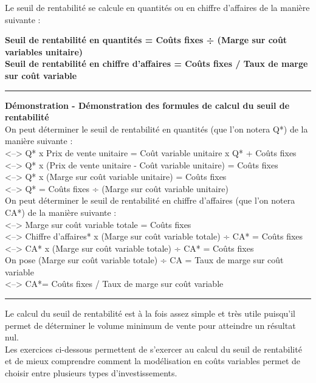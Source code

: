 \documentclass{tufte-handout}
\begin{document}
\begin{enumerate}
Le seuil de rentabilité se calcule en quantités ou en chiffre d'affaires de la manière suivante :\\
\begin{center}
\textbf{Seuil de rentabilité en quantités  =  Coûts fixes ÷ (Marge sur coût variables unitaire)}\\
\textbf{Seuil de rentabilité en chiffre d'affaires = Coûts fixes / Taux de marge sur coût variable}\\
\end{center}

\noindent\rule{\textwidth}{0.5pt}
\textbf{Démonstration - Démonstration des formules de calcul du seuil de rentabilité}\\
On peut déterminer le seuil de rentabilité en quantités (que l'on notera Q*) de la manière suivante :\\
<--> Q* x Prix de vente unitaire = Coût variable unitaire x Q* + Coûts fixes\\
<--> Q* x (Prix de vente unitaire - Coût variable unitaire) =  Coûts fixes\\
<--> Q* x (Marge sur coût variable unitaire) =  Coûts fixes\\
<--> Q* =  Coûts fixes ÷ (Marge sur coût variable unitaire)\\
On peut déterminer le seuil de rentabilité en chiffre d'affaires (que l'on notera CA*) de la manière suivante :\\
<--> Marge sur coût variable totale =  Coûts fixes\\
<--> Chiffre d'affaires* x (Marge sur coût variable totale) ÷ CA* =  Coûts fixes\\
<--> CA* x (Marge sur coût variable totale) ÷ CA* =  Coûts fixes\\
On pose (Marge sur coût variable totale) ÷ CA = Taux de marge sur coût variable\\
<--> CA*= Coûts fixes / Taux de marge sur coût variable\\

\noindent\rule{\textwidth}{0.5pt}

Le calcul du seuil de rentabilité est à la fois assez simple et très utile puisqu'il permet de déterminer le volume minimum de vente pour atteindre un résultat nul.\\

Les exercices ci-dessous permettent de s'exercer au calcul du seuil de rentabilité et de mieux comprendre comment la modélisation en coûts variables permet de choisir entre plusieurs types d'investissements.\\


\end{enumerate}
\end{document}
